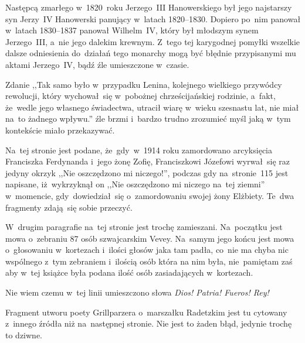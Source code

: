 \documentclass[a4paper,11pt]{article}
\begin{document}
\start {} Następcą zmarłego w~1820~roku Jerzego~III
Hanowerskiego był jego najstarszy syn Jerzy~IV Hanowerski panujący
w~latach 1820--1830. Dopiero po~nim panował w~latach 1830--1837
panował Wilhelm~IV, który był młodszym synem Jerzego~III, a~nie jego
dalekim krewnym. Z~tego tej karygodnej pomyłki wszelkie dalsze
odniesienia do~działań tego monarchy mogą być błędnie przypisanymi mu
aktami Jerzego~IV, bądź źle umieszczone w~czasie.

\vspace{\spaceFour}


\start {} Zdanie ,,Tak samo było w~przypadku Lenina,
kolejnego wielkiego przywódcy rewolucji, który wychował~się w~pobożnej
chrześcijańskiej rodzinie, a~fakt, że~wedle jego własnego świadectwa,
utracił wiarę w~wieku szesnastu lat, nie miał na~to żadnego wpływu.''
źle brzmi i~bardzo trudno zrozumieć myśl jaką w~tym kontekście miało
przekazywać.

\vspace{\spaceFour}


\start {} Na~tej stronie jest podane, że~gdy~w~1914 roku
zamordowano arcyksięcia Franciszka Ferdynanda i~jego żonę Zofię,
Franciszkowi Józefowi wyrwał~się raz jedyny okrzyk ,,Nie oszczędzono
mi niczego!'', podczas gdy na~stronie~115 jest napisane, iż~wykrzyknął
on ,,Nie oszczędzono mi niczego na~tej ziemni'' w~momencie,
gdy~dowiedział~się o~zamordowaniu swojej żony Elżbiety. Te~dwa
fragmenty zdają~się sobie przeczyć.

\vspace{\spaceFour}


\start {} W~drugim paragrafie na~tej stronie jest trochę
zamieszani. Na~początku jest mowa o~zebraniu 87 osób szwajcarskim
Vevey. Na~samym jego końcu jest mowa o~głosowaniu w~kortezach i~ilości
głosów jaka tam padła, co~nie ma chyba nic wspólnego z~tym zebraniem
i~ilością osób która na nim była, nie~pamiętam zaś aby w~tej książce
była podana ilość osób zasiadających w~kortezach.

\vspace{\spaceFour}


\start {} Nie wiem czemu w~tej linii umieszczono słowa
\emph{Dios! Patria! Fueros! Rey!}

\vspace{\spaceFour}


\start {} Fragment utworu poety Grillparzera o~marszałku
Radetzkim jest tu cytowany z~innego źródła niż na~następnej stronie.
Nie jest to żaden błąd, jedynie trochę to dziwne.
\end{document}
